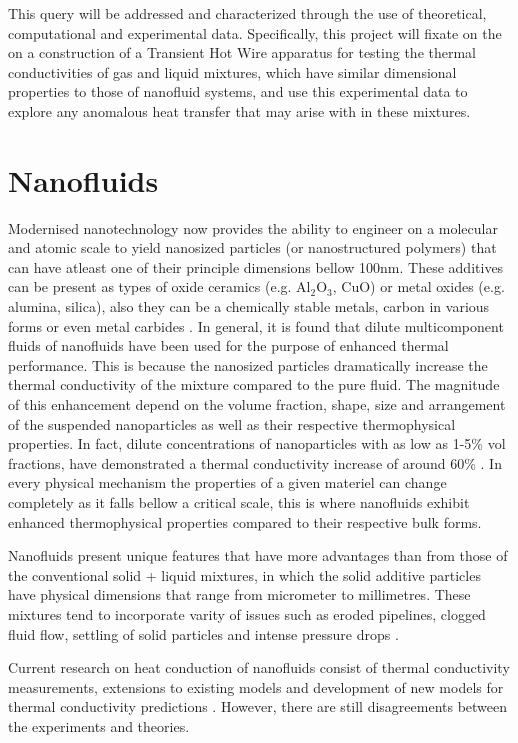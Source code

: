 \documentclass[12pt,MEng]{UoAThesis}
\begin{document}
This query will be addressed and characterized through the use of theoretical, computational and experimental data. Specifically, this project will fixate on the on a construction of a Transient Hot Wire apparatus for testing the thermal conductivities of gas and liquid mixtures, which have similar dimensional properties to those of nanofluid systems, and use this experimental data to explore any anomalous heat transfer that may arise with in these mixtures.
 

\chapter{Nanofluids}
Modernised nanotechnology now provides the ability to engineer on a molecular and atomic scale to yield nanosized particles (or nanostructured polymers) that can have atleast one of their principle dimensions bellow 100nm. These additives can be present as types of oxide ceramics (e.g. Al$_{2}$O$_{3}$, CuO) or metal oxides (e.g. alumina, silica), also they can be a chemically stable metals, carbon in various forms or even metal carbides \cite{sheikholeslami2017applications}. In general, it is found that dilute multicomponent fluids of nanofluids have been used for the purpose of enhanced thermal performance. This is because the nanosized particles dramatically increase the thermal conductivity of the mixture compared to the pure fluid. The magnitude of this enhancement depend on the volume fraction, shape, size and arrangement of the suspended nanoparticles as well as their respective thermophysical properties. In fact, dilute concentrations of nanoparticles with as low as 1-5\% vol fractions, have demonstrated a thermal conductivity increase of around 60\% \cite{xuan2000conceptions, kakacc2009review}. In every physical mechanism the properties of a given materiel can change completely as it falls bellow a critical scale, this is where nanofluids exhibit enhanced thermophysical properties compared to their respective bulk forms. 

Nanofluids present unique features that have more advantages than from those of the conventional solid + liquid mixtures, in which the solid additive particles have physical dimensions that range from micrometer to millimetres. These mixtures tend to incorporate varity of issues such as eroded pipelines, clogged fluid flow, settling of solid particles and intense pressure drops \cite{xuan2000conceptions}. 

Current research on heat conduction of nanofluids consist of thermal conductivity measurements, extensions to existing models and development of new models for thermal conductivity predictions \cite{nanoreview}. However, there are still disagreements between the experiments and theories. 
\end{document}
